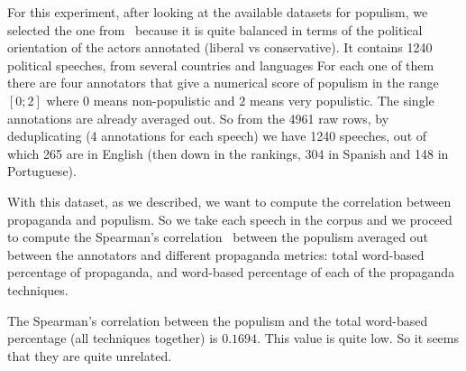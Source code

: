 For this experiment, after looking at the available datasets for populism, we selected the one from~\citet{hawkins2019global} because it is quite balanced in terms of the political orientation of the actors annotated (liberal vs conservative).
It contains 1240 political speeches, from several countries and languages
For each one of them there are four annotators that give a numerical score of populism in the range $[0;2]$ where $0$ means non-populistic and $2$ means very populistic. The single annotations are already averaged out.
So from the 4961 raw rows, by deduplicating (4 annotations for each speech) we have 1240 speeches, out of which 265 are in English (then down in the rankings, 304 in Spanish and 148 in Portuguese).






With this dataset, as we described, we want to compute the 
correlation between propaganda and populism. So we take each speech in the corpus and we proceed to compute the Spearman's correlation~\citep{spearman1910correlation} between the  populism averaged out between the annotators and different propaganda metrics: total word-based percentage of propaganda, and word-based percentage of each of the propaganda techniques. 


The Spearman's correlation between the populism and the total word-based percentage (all techniques together) is $0.1694$. This value is quite low. So it seems that they are quite unrelated.

